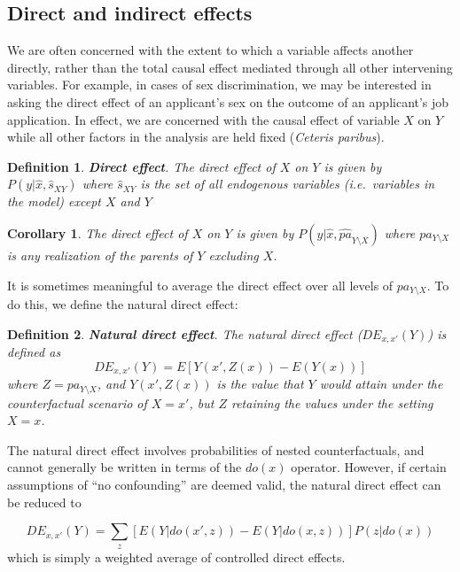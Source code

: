 \documentclass[11pt]{article}
\numberwithin{equation}{section}
\newtheorem{defn}{Definition}[section]
\newtheorem{cor}{Corollary}[section]
\begin{document}
\subsection{Direct and indirect effects}

We are often concerned with the extent to which a variable affects another directly, rather than the total causal effect mediated through all other intervening variables. For example, in cases of sex discrimination, we may be interested in asking the direct effect of an applicant's sex on the outcome of an applicant's job application. In effect, we are concerned with the causal effect of variable $X$ on $Y$ while all other factors in the analysis are held fixed (\textit{Ceteris paribus}).

\begin{defn}
\textbf{Direct effect}. The direct effect of $X$ on $Y$ is given by $P(y|\hat{x},\hat{s}_{XY})$ where $\hat{s}_{XY}$ is the set of all endogenous variables (i.e.\ variables in the model) except $X$ and $Y$
\end{defn}

\begin{cor}
The direct effect of $X$ on $Y$ is given by $P(y|\hat{x}, \hat{pa}_{Y \setminus X})$ where $pa_{Y \setminus X}$ is any realization of the parents of $Y$ excluding $X$.
\end{cor}

It is sometimes meaningful to average the direct effect over all levels of $pa_{Y\setminus X}$. To do this, we define the natural direct effect:

\begin{defn}
\textbf{Natural direct effect}. The natural direct effect ($DE_{x,x'}(Y)$) is defined as
\begin{equation}
DE_{x,x'}(Y) = E[Y(x', Z(x)) - E(Y(x))]
\end{equation}
where $Z= pa_{Y\setminus X}$, and $Y(x', Z(x))$ is the value that $Y$ would attain under the counterfactual scenario of $X=x'$, but $Z$ retaining the values under the setting $X=x$.
\end{defn}

The natural direct effect involves probabilities of nested counterfactuals, and cannot generally be written in terms of the $do(x)$ operator. However, if certain assumptions of ``no confounding'' are deemed valid, the natural direct effect can be reduced to 

\begin{equation}
DE_{x,x'}(Y) = \sum_z [E(Y|do(x', z)) - E(Y| do(x,z))]P(z|do(x))
\end{equation}
which is simply a weighted average of controlled direct effects. 
\end{document}
